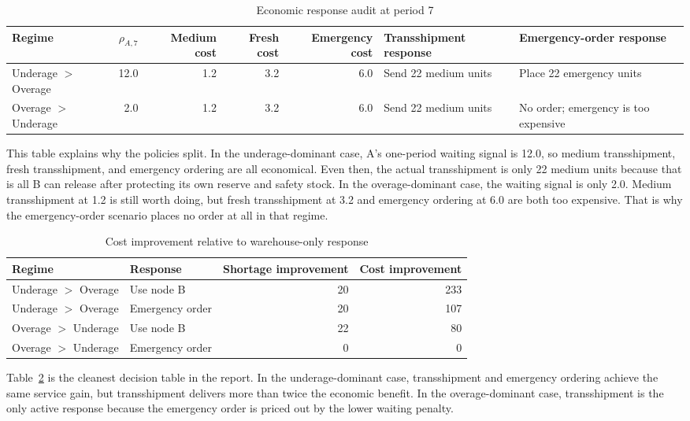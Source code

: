 \documentclass[11pt]{article}
\begin{document}
\begin{table}[H]
\centering
\caption{Economic response audit at period 7}
\label{tab:response-audit}
\small
\begin{tabularx}{\textwidth}{@{}lrrrr>{\raggedright\arraybackslash}X>{\raggedright\arraybackslash}X@{}}
\toprule
Regime & $\rho_{A,7}$ & Medium cost & Fresh cost & Emergency cost & Transshipment response & Emergency-order response \\
\midrule
Underage $>$ Overage & 12.0 & 1.2 & 3.2 & 6.0 & Send 22 medium units & Place 22 emergency units \\
Overage $>$ Underage & 2.0 & 1.2 & 3.2 & 6.0 & Send 22 medium units & No order; emergency is too expensive \\
\bottomrule
\end{tabularx}
\end{table}

This table explains why the policies split. In the underage-dominant case, A's one-period waiting signal is 12.0, so medium transshipment, fresh transshipment, and emergency ordering are all economical. Even then, the actual transshipment is only 22 medium units because that is all B can release after protecting its own reserve and safety stock. In the overage-dominant case, the waiting signal is only 2.0. Medium transshipment at 1.2 is still worth doing, but fresh transshipment at 3.2 and emergency ordering at 6.0 are both too expensive. That is why the emergency-order scenario places no order at all in that regime.

\begin{table}[H]
\centering
\caption{Cost improvement relative to warehouse-only response}
\label{tab:response-delta}
\begin{tabular}{llrr}
\toprule
Regime & Response & Shortage improvement & Cost improvement \\
\midrule
Underage $>$ Overage & Use node B & 20 & 233 \\
Underage $>$ Overage & Emergency order & 20 & 107 \\
Overage $>$ Underage & Use node B & 22 & 80 \\
Overage $>$ Underage & Emergency order & 0 & 0 \\
\bottomrule
\end{tabular}
\end{table}

Table~\ref{tab:response-delta} is the cleanest decision table in the report. In the underage-dominant case, transshipment and emergency ordering achieve the same service gain, but transshipment delivers more than twice the economic benefit. In the overage-dominant case, transshipment is the only active response because the emergency order is priced out by the lower waiting penalty.
\end{document}
